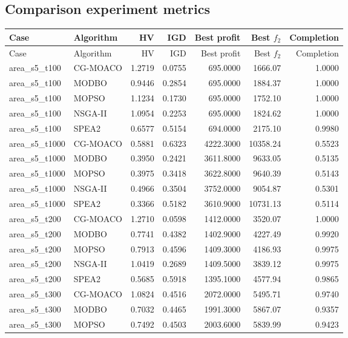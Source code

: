 \subsection*{Comparison experiment metrics}
\begin{longtable}{llrrrrr}
\toprule
Case & Algorithm & HV & IGD & Best profit & Best $f_2$ & Completion \\
\midrule
\endfirsthead
\toprule
Case & Algorithm & HV & IGD & Best profit & Best $f_2$ & Completion \\
\midrule
\endhead
area\_s5\_t100 & CG-MOACO & 1.2719 & 0.0755 & 695.0000 & 1666.07 & 1.0000 \\
area\_s5\_t100 & MODBO & 0.9446 & 0.2854 & 695.0000 & 1884.37 & 1.0000 \\
area\_s5\_t100 & MOPSO & 1.1234 & 0.1730 & 695.0000 & 1752.10 & 1.0000 \\
area\_s5\_t100 & NSGA-II & 1.0954 & 0.2253 & 695.0000 & 1824.62 & 1.0000 \\
area\_s5\_t100 & SPEA2 & 0.6577 & 0.5154 & 694.0000 & 2175.10 & 0.9980 \\
area\_s5\_t1000 & CG-MOACO & 0.5881 & 0.6323 & 4222.3000 & 10358.24 & 0.5523 \\
area\_s5\_t1000 & MODBO & 0.3950 & 0.2421 & 3611.8000 & 9633.05 & 0.5135 \\
area\_s5\_t1000 & MOPSO & 0.3975 & 0.3418 & 3622.8000 & 9640.39 & 0.5143 \\
area\_s5\_t1000 & NSGA-II & 0.4966 & 0.3504 & 3752.0000 & 9054.87 & 0.5301 \\
area\_s5\_t1000 & SPEA2 & 0.3366 & 0.5182 & 3610.9000 & 10731.13 & 0.5114 \\
area\_s5\_t200 & CG-MOACO & 1.2710 & 0.0598 & 1412.0000 & 3520.07 & 1.0000 \\
area\_s5\_t200 & MODBO & 0.7741 & 0.4382 & 1402.9000 & 4227.49 & 0.9920 \\
area\_s5\_t200 & MOPSO & 0.7913 & 0.4596 & 1409.3000 & 4186.93 & 0.9975 \\
area\_s5\_t200 & NSGA-II & 1.0419 & 0.2689 & 1409.5000 & 3839.12 & 0.9975 \\
area\_s5\_t200 & SPEA2 & 0.5685 & 0.5918 & 1395.1000 & 4577.94 & 0.9865 \\
area\_s5\_t300 & CG-MOACO & 1.0824 & 0.4516 & 2072.0000 & 5495.71 & 0.9740 \\
area\_s5\_t300 & MODBO & 0.7032 & 0.4465 & 1991.3000 & 5867.07 & 0.9357 \\
area\_s5\_t300 & MOPSO & 0.7492 & 0.4503 & 2003.6000 & 5839.99 & 0.9423 \\

\end{longtable}
